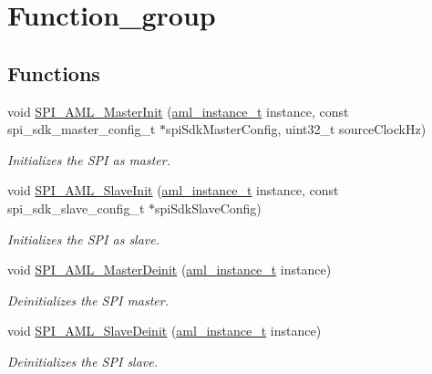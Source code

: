 \hypertarget{group__function__group}{}\section{Function\+\_\+group}
\label{group__function__group}
\subsection*{Functions}
\begin{DoxyCompactItemize}
\item 
void \mbox{\hyperlink{group__function__group_gac1f59da071342e3e2f691b121d737115}{S\+P\+I\+\_\+\+A\+M\+L\+\_\+\+Master\+Init}} (\mbox{\hyperlink{common__aml_8h_a562bd37c7d07adcedec5993bc0cd96e5}{aml\+\_\+instance\+\_\+t}} instance, const spi\+\_\+sdk\+\_\+master\+\_\+config\+\_\+t $\ast$spi\+Sdk\+Master\+Config, uint32\+\_\+t source\+Clock\+Hz)
\begin{DoxyCompactList}\small\item\em Initializes the S\+PI as master. \end{DoxyCompactList}\item 
void \mbox{\hyperlink{group__function__group_ga456542ab17179c5e19b712f398c24831}{S\+P\+I\+\_\+\+A\+M\+L\+\_\+\+Slave\+Init}} (\mbox{\hyperlink{common__aml_8h_a562bd37c7d07adcedec5993bc0cd96e5}{aml\+\_\+instance\+\_\+t}} instance, const spi\+\_\+sdk\+\_\+slave\+\_\+config\+\_\+t $\ast$spi\+Sdk\+Slave\+Config)
\begin{DoxyCompactList}\small\item\em Initializes the S\+PI as slave. \end{DoxyCompactList}\item 
void \mbox{\hyperlink{group__function__group_gac0af5f79571c9a899c723c996d37a8b0}{S\+P\+I\+\_\+\+A\+M\+L\+\_\+\+Master\+Deinit}} (\mbox{\hyperlink{common__aml_8h_a562bd37c7d07adcedec5993bc0cd96e5}{aml\+\_\+instance\+\_\+t}} instance)
\begin{DoxyCompactList}\small\item\em Deinitializes the S\+PI master. \end{DoxyCompactList}\item 
void \mbox{\hyperlink{group__function__group_gab92008fdba7eaa3bc22c13e5094d9f78}{S\+P\+I\+\_\+\+A\+M\+L\+\_\+\+Slave\+Deinit}} (\mbox{\hyperlink{common__aml_8h_a562bd37c7d07adcedec5993bc0cd96e5}{aml\+\_\+instance\+\_\+t}} instance)
\begin{DoxyCompactList}\small\item\em Deinitializes the S\+PI slave. \end{DoxyCompactList}\item 

\end{DoxyCompactItemize}
